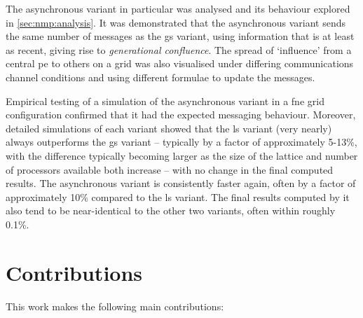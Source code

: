 The asynchronous variant in particular was analysed and its behaviour explored in \cref{sec:nmp:analysis}.  It was demonstrated that the asynchronous variant sends the same number of messages as the \gls{gs} variant, using information that is at least as recent, giving rise to \emph{generational confluence}.  The spread of `influence' from a central \gls{pe} to others on a grid was also visualised under differing communications channel conditions and using different formulae to update the messages.

Empirical testing of a simulation of the asynchronous variant in a \gls{fne} grid configuration confirmed that it had the expected messaging behaviour.  Moreover, detailed simulations of each variant showed that the \gls{ls} variant (very nearly) always outperforms the \gls{gs} variant -- typically by a factor of approximately 5-13\%, with the difference typically becoming larger as the size of the lattice and number of processors available both increase -- with no change in the final computed results.  The asynchronous variant is consistently faster again, often by a factor of approximately 10\% compared to the \gls{ls} variant.  The final results computed by it also tend to be near-identical to the other two variants, often within roughly 0.1\%.

\section{Contributions}
This work makes the following main contributions:

